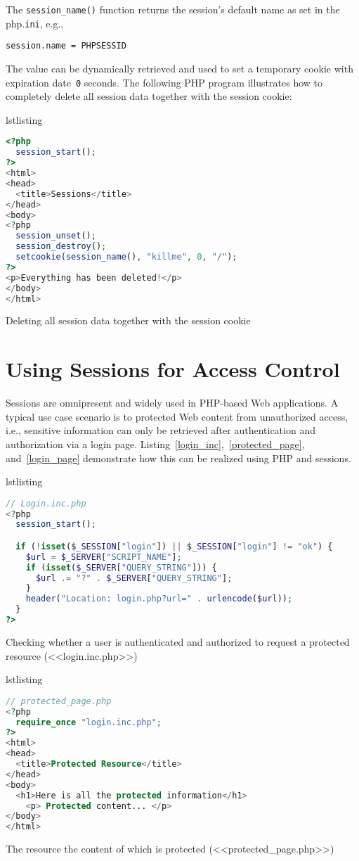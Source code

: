 \documentclass[a4paper, justified, notoc]{tufte-handout} %
\makeatletter
\newenvironment{listing}[1][htbp]
  {\ifvmode\else\unskip\fi\begin{@tufte@float}[#1]{lstlisting}{}}
  {\end{@tufte@float} } %
\makeatother
\begin{document}
The \texttt{session\_name()} function returns the session's default name as set in the php.\texttt{ini}, e.g., 
\begin{Verbatim}
session.name = PHPSESSID
\end{Verbatim}
The value can be dynamically retrieved and used to set a temporary cookie with expiration date~\texttt{0} seconds.
The following PHP program illustrates how to completely delete all session data together with the session cookie:
\begin{listing}
\begin{lstlisting}[language=PHP]
<?php
  session_start();
?>
<html>
<head>
  <title>Sessions</title>
</head>
<body>
<?php
  session_unset();
  session_destroy();
  setcookie(session_name(), "killme", 0, "/");
?>
<p>Everything has been deleted!</p>
</body>
</html>
\end{lstlisting}
	\caption{Deleting all session data together with the session cookie}
	\label{delete_all_session_data}
\end{listing}


\section{Using Sessions for Access Control} %
\label{sec:using_sessions_for_access_control}
Sessions are omnipresent and widely used in PHP-based Web applications.
A typical use case scenario is to protected Web content from unauthorized access, i.e., sensitive information can only be retrieved after authentication and authorization via a login page.
Listing~\ref{login_inc},~\ref{protected_page}, and~\ref{login_page} demonstrate how this can be realized using PHP and sessions.

\begin{listing}
\begin{lstlisting}[language=PHP]
// Login.inc.php
<?php
  session_start();

  if (!isset($_SESSION["login"]) || $_SESSION["login"] != "ok") {
    $url = $_SERVER["SCRIPT_NAME"];
    if (isset($_SERVER["QUERY_STRING"])) {
      $url .= "?" . $_SERVER["QUERY_STRING"];
    }
    header("Location: login.php?url=" . urlencode($url));
  }
?>
\end{lstlisting}
	\caption{Checking whether a user is authenticated and authorized to request a protected resource (<<login.inc.php>>)}
	\label{login_inc}
\end{listing}


\begin{listing}
\begin{lstlisting}[language=PHP]
// protected_page.php
<?php
  require_once "login.inc.php";
?>
<html>
<head>
  <title>Protected Resource</title>
</head>
<body>
  <h1>Here is all the protected information</h1>
	<p> Protected content... </p>
</body>
</html>
\end{lstlisting}
	\caption{The resource the content of which is protected (<<protected\_page.php>>)}
	\label{protected_page}
\end{listing}
\end{document}
